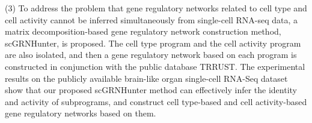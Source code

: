 \begin{abstracten}
(3) To address the problem that gene regulatory networks related to cell type and cell activity cannot be inferred simultaneously from single-cell RNA-seq data, 
a matrix decomposition-based gene regulatory network construction method, scGRNHunter, is proposed. 
The cell type program and the cell activity program are also isolated, and then a gene regulatory network based on each program is constructed in conjunction with the public database TRRUST. 
The experimental results on the publicly available brain-like organ single-cell RNA-Seq dataset show that our proposed scGRNHunter method can effectively infer the identity and activity of subprograms, 
and construct cell type-based and cell activity-based gene regulatory networks based on them.




\end{abstracten}
